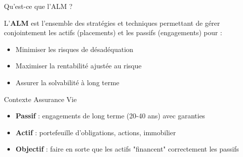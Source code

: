 \documentclass[10pt,aspectratio=169,xcolor={dvipsnames}]{beamer}
\begin{document}
\begin{frame}{Qu'est-ce que l'ALM ?}
\begin{definition}
L'\textbf{ALM} est l'ensemble des stratégies et techniques permettant de gérer conjointement les actifs (placements) et les passifs (engagements) pour :
\begin{itemize}
    \item Minimiser les risques de désadéquation
    \item Maximiser la rentabilité ajustée au risque
    \item Assurer la solvabilité à long terme
\end{itemize}
\end{definition}

\vspace{0.3cm}
\begin{block}{Contexte Assurance Vie}
\begin{itemize}
    \item \textbf{Passif} : engagements de long terme (20-40 ans) avec garanties
    \item \textbf{Actif} : portefeuille d'obligations, actions, immobilier
    \item \textbf{Objectif} : faire en sorte que les actifs "financent" correctement les passifs
\end{itemize}
\end{block}
\end{frame}
\end{document}
